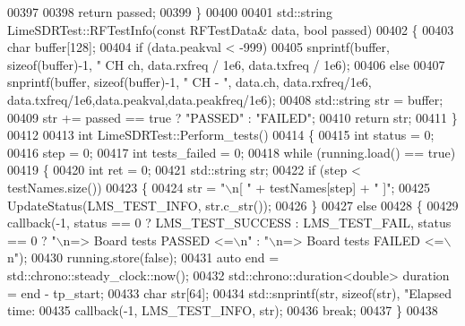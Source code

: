 \begin{DoxyCode}
{{{00397 
00398     \textcolor{keywordflow}{return} passed;
00399 \}
00400 
00401 std::string LimeSDRTest::RFTestInfo(\textcolor{keyword}{const} RFTestData& data, \textcolor{keywordtype}{bool} passed)
00402 \{
00403     \textcolor{keywordtype}{char} buffer[128];
00404     \textcolor{keywordflow}{if} (data.peakval < -999)
00405         snprintf(buffer, \textcolor{keyword}{sizeof}(buffer)-1, \textcolor{stringliteral}{"  CH%
      ch, data.rxfreq / 1e6, data.txfreq / 1e6);
00406     \textcolor{keywordflow}{else}
00407     snprintf(buffer, \textcolor{keyword}{sizeof}(buffer)-1, \textcolor{stringliteral}{"  CH%
       - "}, data.ch, data.rxfreq/1e6, data.txfreq/1e6,data.peakval,data.peakfreq/1e6);
00408     std::string str = buffer;
00409     str += passed == \textcolor{keyword}{true} ? \textcolor{stringliteral}{"PASSED"} : \textcolor{stringliteral}{"FAILED"};
00410     \textcolor{keywordflow}{return} str;
00411 \}
00412 
00413 \textcolor{keywordtype}{int} LimeSDRTest::Perform_tests()
00414 \{
00415     \textcolor{keywordtype}{int} status = 0;
00416     step = 0;
00417     \textcolor{keywordtype}{int} tests\_failed = 0;
00418     \textcolor{keywordflow}{while} (running.load() == \textcolor{keyword}{true})
00419     \{
00420         \textcolor{keywordtype}{int} ret = 0;
00421         std::string str;
00422         \textcolor{keywordflow}{if} (step < testNames.size())
00423         \{
00424             str = \textcolor{stringliteral}{"\(\backslash\)n[ "} + testNames[step] + \textcolor{stringliteral}{" ]"};
00425             UpdateStatus(LMS_TEST_INFO, str.c\_str());
00426         \}
00427         \textcolor{keywordflow}{else}
00428         \{
00429             callback(-1, status == 0 ? LMS_TEST_SUCCESS : LMS_TEST_FAIL, status == 0 ? \textcolor{stringliteral}{"\(\backslash\)n=> Board tests
       PASSED <=\(\backslash\)n"} : \textcolor{stringliteral}{"\(\backslash\)n=> Board tests FAILED <=\(\backslash\)n"});
00430             running.store(\textcolor{keyword}{false});
00431             \textcolor{keyword}{auto} end = std::chrono::steady\_clock::now();
00432             std::chrono::duration<double> duration = end - tp\_start;
00433             \textcolor{keywordtype}{char} str[64];
00434             std::snprintf(str, \textcolor{keyword}{sizeof}(str), \textcolor{stringliteral}{"Elapsed time: %
00435             callback(-1,  LMS_TEST_INFO, str);
00436             \textcolor{keywordflow}{break};
00437         \}
00438 
}}}}}
\end{DoxyCode}
